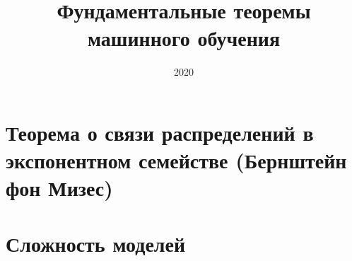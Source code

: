 \documentclass{article}
\title{Фундаментальные теоремы машинного обучения}
\date{2020}
\numberwithin{equation}{section}
\begin{document}
    \maketitle
    \tableofcontents
    \clearpage
    \section{Теорема о связи распределений в экспонентном семействе (Бернштейн фон Мизес)}
    {}
    \clearpage
    \section{Сложность моделей}
    {}


\end{document}

